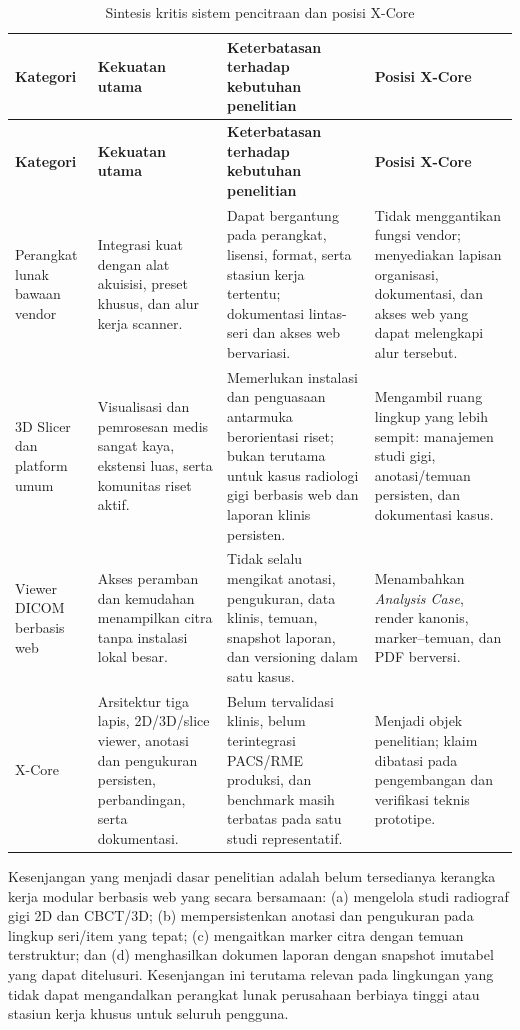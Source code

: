 \documentclass[12pt,a4paper,oneside]{report}
\begin{document}
\begin{longtable}{p{3.0cm}p{3.7cm}p{3.7cm}p{3.5cm}}
\caption{Sintesis kritis sistem pencitraan dan posisi X-Core}\label{tab:sota}\\
\toprule
\textbf{Kategori} & \textbf{Kekuatan utama} & \textbf{Keterbatasan terhadap kebutuhan penelitian} & \textbf{Posisi X-Core} \\
\midrule
\endfirsthead
\toprule
\textbf{Kategori} & \textbf{Kekuatan utama} & \textbf{Keterbatasan terhadap kebutuhan penelitian} & \textbf{Posisi X-Core} \\
\midrule
\endhead
Perangkat lunak bawaan vendor & Integrasi kuat dengan alat akuisisi, preset khusus, dan alur kerja scanner. & Dapat bergantung pada perangkat, lisensi, format, serta stasiun kerja tertentu; dokumentasi lintas-seri dan akses web bervariasi. & Tidak menggantikan fungsi vendor; menyediakan lapisan organisasi, dokumentasi, dan akses web yang dapat melengkapi alur tersebut. \\
3D Slicer dan platform umum & Visualisasi dan pemrosesan medis sangat kaya, ekstensi luas, serta komunitas riset aktif. & Memerlukan instalasi dan penguasaan antarmuka berorientasi riset; bukan terutama untuk kasus radiologi gigi berbasis web dan laporan klinis persisten. & Mengambil ruang lingkup yang lebih sempit: manajemen studi gigi, anotasi/temuan persisten, dan dokumentasi kasus. \\
Viewer DICOM berbasis web & Akses peramban dan kemudahan menampilkan citra tanpa instalasi lokal besar. & Tidak selalu mengikat anotasi, pengukuran, data klinis, temuan, snapshot laporan, dan versioning dalam satu kasus. & Menambahkan \textit{Analysis Case}, render kanonis, marker--temuan, dan PDF berversi. \\
X-Core & Arsitektur tiga lapis, 2D/3D/slice viewer, anotasi dan pengukuran persisten, perbandingan, serta dokumentasi. & Belum tervalidasi klinis, belum terintegrasi PACS/RME produksi, dan benchmark masih terbatas pada satu studi representatif. & Menjadi objek penelitian; klaim dibatasi pada pengembangan dan verifikasi teknis prototipe. \\
\bottomrule
\end{longtable}

Kesenjangan yang menjadi dasar penelitian adalah belum tersedianya kerangka kerja modular berbasis web yang secara bersamaan: (a) mengelola studi radiograf gigi 2D dan CBCT/3D; (b) mempersistenkan anotasi dan pengukuran pada lingkup seri/item yang tepat; (c) mengaitkan marker citra dengan temuan terstruktur; dan (d) menghasilkan dokumen laporan dengan snapshot imutabel yang dapat ditelusuri. Kesenjangan ini terutama relevan pada lingkungan yang tidak dapat mengandalkan perangkat lunak perusahaan berbiaya tinggi atau stasiun kerja khusus untuk seluruh pengguna.
\end{document}
